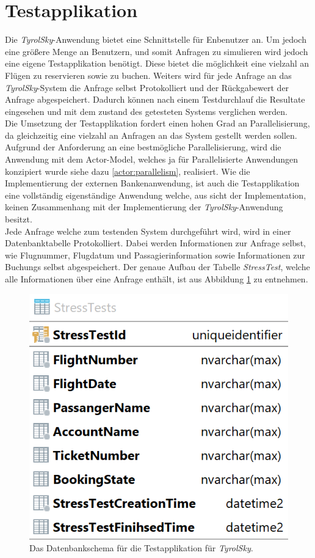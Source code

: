 \section{Testapplikation}
\label{subsec:implementation:TestApplikation} 
Die \textit{TyrolSky}-Anwendung bietet eine Schnittstelle für Enbenutzer an. Um jedoch eine größere Menge an Benutzern, und somit Anfragen zu simulieren wird jedoch eine eigene Testapplikation benötigt. Diese bietet die möglichkeit eine vielzahl an Flügen zu reservieren sowie zu buchen. Weiters wird für jede Anfrage an das \textit{TyrolSky}-System die Anfrage selbst Protokolliert und der Rückgabewert der Anfrage abgespeichert. Dadurch können nach einem Testdurchlauf die Resultate eingesehen und mit dem zustand des getesteten Systems verglichen werden. \\
Die Umsetzung der Testapplikation fordert einen hohen Grad an Parallelisierung, da gleichzeitig eine vielzahl an Anfragen an das System gestellt werden sollen. Aufgrund der Anforderung an eine bestmögliche Parallelisierung, wird die Anwendung mit dem Actor-Model, welches ja für Parallelisierte Anwendungen konzipiert wurde siehe dazu \ref{actor:parallelism}, realisiert. Wie die Implementierung der externen Bankenanwendung, ist auch die Testapplikation eine vollständig eigenständige Anwendung welche, aus sicht der Implementation, keinen Zusammenhang mit der Implementierung der \textit{TyrolSky}-Anwendung besitzt. \\
Jede Anfrage welche zum testenden System durchgeführt wird, wird in einer Datenbanktabelle Protokolliert. Dabei werden Informationen zur Anfrage selbst, wie Flugnummer, Flugdatum und Passagierinformation sowie Informationen zur Buchungs selbst abgespeichert. Der genaue Aufbau der Tabelle \textit{StressTest}, welche alle Informationen über eine Anfrage enthält, ist aus Abbildung \ref{fig:implementation:stressTestDbSchema} zu entnehmen.
\begin{figure}
    \centering
    \includegraphics[width=0.4\linewidth]{gfx/implementation/stressTestDbSchema}
    \caption{Das Datenbankschema für die Testapplikation für \textit{TyrolSky}.}
    \label{fig:implementation:stressTestDbSchema}
\end{figure} 

